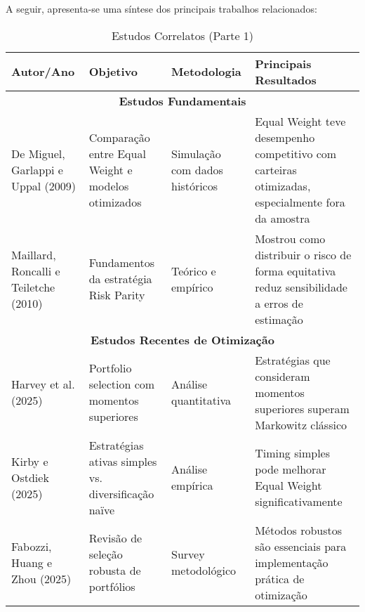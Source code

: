 A seguir, apresenta-se uma síntese dos principais trabalhos relacionados:

\begin{table}[H]
\centering
\caption{Estudos Correlatos (Parte 1)}
\begin{tabular}{|p{2.3cm}|p{3.2cm}|p{2.6cm}|p{3.2cm}|}
\hline
\textbf{Autor/Ano} & \textbf{Objetivo} & \textbf{Metodologia} & \textbf{Principais Resultados} \\
\hline
\multicolumn{4}{|c|}{\textbf{Estudos Fundamentais}} \\
\hline
De Miguel, Garlappi e Uppal (2009) & Comparação entre Equal Weight e modelos otimizados & Simulação com dados históricos & Equal Weight teve desempenho competitivo com carteiras otimizadas, especialmente fora da amostra \\
\hline
Maillard, Roncalli e Teiletche (2010) & Fundamentos da estratégia Risk Parity & Teórico e empírico & Mostrou como distribuir o risco de forma equitativa reduz sensibilidade a erros de estimação \\
\hline
\multicolumn{4}{|c|}{\textbf{Estudos Recentes de Otimização}} \\
\hline
Harvey et al. (2025) & Portfolio selection com momentos superiores & Análise quantitativa & Estratégias que consideram momentos superiores superam Markowitz clássico \\
\hline
Kirby e Ostdiek (2025) & Estratégias ativas simples vs. diversificação naïve & Análise empírica & Timing simples pode melhorar Equal Weight significativamente \\
\hline
Fabozzi, Huang e Zhou (2025) & Revisão de seleção robusta de portfólios & Survey metodológico & Métodos robustos são essenciais para implementação prática de otimização \\
\hline
\end{tabular}
\label{tab:estudos_correlatos_1}
\end{table}

